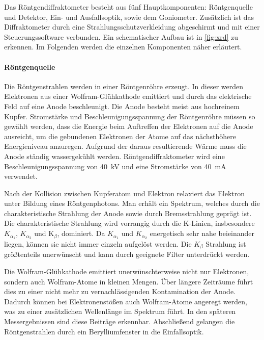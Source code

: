 Das Röntgendiffraktometer besteht aus fünf Hauptkomponenten: Röntgenquelle und Detektor, Ein- und Ausfallsoptik,
sowie dem Goniometer.
Zusätzlich ist das Diffraktometer durch eine Strahlungsschutzverkleidung abgeschirmt und mit einer Steuerungssoftware
verbunden.
Ein schematischer Aufbau ist in \cref{fig:xrd} zu erkennen.
Im Folgenden werden die einzelnen Komponenten näher erläutert.

\paragraph{Röntgenquelle}
Die Röntgenstrahlen werden in einer Röntgenröhre erzeugt.
In dieser werden Elektronen aus einer Wolfram-Glühkathode emittiert und durch das elektrische Feld auf eine Anode
beschleunigt.
Die Anode besteht meist aus hochreinem Kupfer.
Stromstärke und Beschleunigungsspannung der Röntgenröhre müssen so gewählt werden, dass die Energie beim Auftreffen der
Elektronen auf die Anode ausreicht, um die gebundenen Elektronen der Atome auf das nächsthöhere Energieniveau anzuregen.
Aufgrund der daraus resultierende Wärme muss die Anode ständig wassergekühlt werden.
Röntgendiffraktometer wird eine Beschleunigungsspannung von \qty{40}{\kilo\volt} und eine Stromstärke
von \qty{40}{\milli\ampere} verwendet.

Nach der Kollision zwischen Kupferatom und Elektron relaxiert das Elektron unter Bildung eines Röntgenphotons.
Man erhält ein Spektrum, welches durch die charakteristische Strahlung der Anode sowie durch Bremsstrahlung
geprägt ist.
Die charakteristische Strahlung wird vorrangig durch die K-Linien, insbesondere $K_{\alpha_1}$, $K_{\alpha_2}$
und K$_{\beta}$, dominiert.
Da $K_{\alpha_1}$ und $K_{\alpha_2}$ energetisch sehr nahe beieinander liegen, können sie nicht immer einzeln
aufgelöst werden.
Die $K_{\beta}$ Strahlung ist größtenteils unerwünscht und kann durch geeignete Filter unterdrückt werden.

Die Wolfram-Glühkathode emittiert unerwünschterweise nicht nur Elektronen, sondern auch Wolfram-Atome in kleinen Mengen.
Über längere Zeiträume führt dies zu einer nicht mehr zu vernachlässigenden Kontamination der Anode.
Dadurch können bei Elektronenstößen auch Wolfram-Atome angeregt werden, was zu einer zusätzlichen Wellenlänge im
Spektrum führt.
In den späteren Messergebnissen sind diese Beiträge erkennbar.
Abschließend gelangen die Röntgenstrahlen durch ein Berylliumfenster in die Einfallsoptik.

